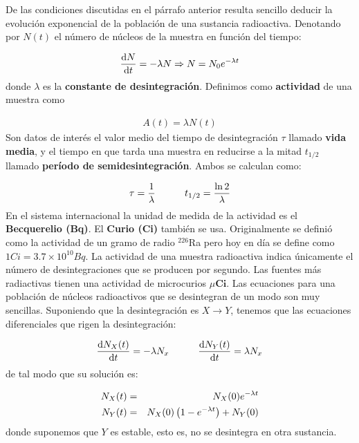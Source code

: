 De las condiciones discutidas en el párrafo anterior resulta sencillo deducir la evolución exponencial de la población de una sustancia radioactiva. Denotando por $N(t)$ el número de núcleos de la muestra en función del tiempo:

\begin{eqnarray}
	\frac{\mathrm{d} N}{\mathrm{d} t} = - \lambda N \Rightarrow N = N_0 e^{-\lambda t} 
\end{eqnarray}
donde $\lambda$ es la \textbf{constante de desintegración}. Definimos como \textbf{actividad} de una muestra como

\begin{eqnarray}
	A(t) = \lambda N(t)
\end{eqnarray}
Son datos de interés el valor medio del tiempo de desintegración $\tau$ llamado \textbf{vida media}, y el tiempo en que tarda una muestra en reducirse a la mitad $t_{1/2}$ llamado \textbf{período de semidesintegración}. Ambos se calculan como:

\begin{eqnarray}
	\tau = \frac{1}{\lambda} \quad \quad \quad t_{1/2} = \frac{\ln 2}{\lambda}
\end{eqnarray}
En el sistema internacional la unidad de medida de la actividad es el \textbf{Becquerelio (Bq)}. El \textbf{Curio (Ci)} también se usa. Originalmente se definió como la actividad de un gramo de radio $^{226}$Ra pero hoy en día se define como $1 \unit{Ci} = 3.7 \times 10^{10} \unit{Bq}$. La actividad de una muestra radioactiva indica únicamente el número de desintegraciones que se producen por segundo. Las fuentes más radiactivas tienen una actividad de microcurios $\mu \textbf{Ci}$. Las ecuaciones para una población de núcleos radioactivos que se desintegran de un modo son muy sencillas. Suponiendo que la desintegración es $X\rightarrow Y$, tenemos que las ecuaciones diferenciales que rigen la desintegración:

\begin{eqnarray}
	\frac{\mathrm{d} N_X(t)}{\mathrm{d} t} = - \lambda N_x \quad \quad \quad \frac{\mathrm{d} N_Y(t)}{\mathrm{d} t} = \lambda N_x
\end{eqnarray}
de tal modo que su solución es:

\begin{eqnarray}
	N_X (t) & = & N_X(0) e^{-\lambda t} \\
	N_Y (t) & = & N_X(0) \left( 1-e^{-\lambda t} \right) + N_Y(0)
\end{eqnarray}
donde suponemos que $Y$ es estable, esto es, no se desintegra en otra sustancia.

